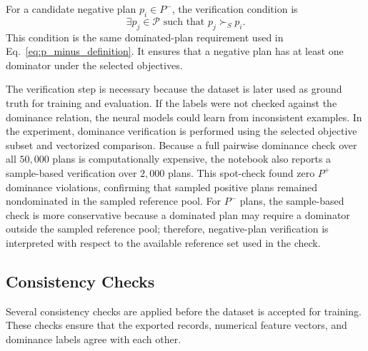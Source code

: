 For a candidate negative plan $p_i \in P^{-}$, the verification condition is
\begin{equation}
    \exists p_j \in \mathcal{P}
    \text{ such that }
    p_j \succ_S p_i.
    \label{eq:negative_verification_condition}
\end{equation}
This condition is the same dominated-plan requirement used in Eq.~\eqref{eq:p_minus_definition}. It ensures that a negative plan has at least one dominator under the selected objectives.

The verification step is necessary because the dataset is later used as ground truth for training and evaluation. If the labels were not checked against the dominance relation, the neural models could learn from inconsistent examples. In the experiment, dominance verification is performed using the selected objective subset and vectorized comparison. Because a full pairwise dominance check over all $50{,}000$ plans is computationally expensive, the notebook also reports a sample-based verification over $2{,}000$ plans. This spot-check found zero $P^{+}$ dominance violations, confirming that sampled positive plans remained nondominated in the sampled reference pool. For $P^{-}$ plans, the sample-based check is more conservative because a dominated plan may require a dominator outside the sampled reference pool; therefore, negative-plan verification is interpreted with respect to the available reference set used in the check.

\subsection{Consistency Checks}
\label{subsec:consistency_checks}

Several consistency checks are applied before the dataset is accepted for training. These checks ensure that the exported records, numerical feature vectors, and dominance labels agree with each other.

